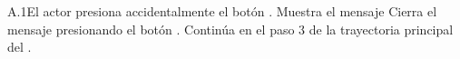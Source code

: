 \begin{UCtrayectoriaA}{A.1}{El actor presiona accidentalmente el botón \IUbutton{+}.}
	\UCpaso Muestra el mensaje 
	\UCpaso[\UCactor] Cierra el mensaje presionando el botón .
	\UCpaso Continúa en el paso 3 de la trayectoria principal del .
\end{UCtrayectoriaA}